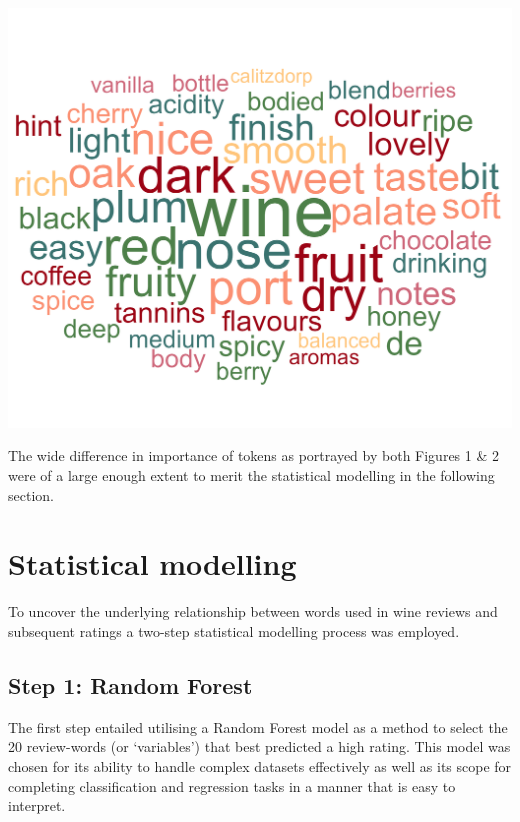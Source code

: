 \documentclass[11pt,preprint]{elsarticle}
\let\origfigure\figure
\let\endorigfigure\endfigure
\renewenvironment{figure}[1][2] {
    \expandafter\origfigure\expandafter[H]
} {
    \endorigfigure
}
\numberwithin{equation}{section}
\numberwithin{figure}{section}
\numberwithin{table}{section}
\begin{document}
\begin{figure}[H]

{\centering \includegraphics[width=0.8\linewidth]{writeup/fig2} 

}

\caption{Word cloud of popular words in reviews based on popularity index\label{fig:fig2}}\label{fig:fig2}
\end{figure}

The wide difference in importance of tokens as portrayed by both Figures
1 \& 2 were of a large enough extent to merit the statistical modelling
in the following section.

\newpage

\section{Statistical modelling}\label{statistical-modelling}

\label{StatMod} To uncover the underlying relationship between words
used in wine reviews and subsequent ratings a two-step statistical
modelling process was employed.

\subsection{Step 1: Random Forest}\label{step-1-random-forest}

The first step entailed utilising a Random Forest model as a method to
select the 20 review-words (or `variables') that best predicted a high
rating. This model was chosen for its ability to handle complex datasets
effectively as well as its scope for completing classification and
regression tasks in a manner that is easy to interpret.
\end{document}
